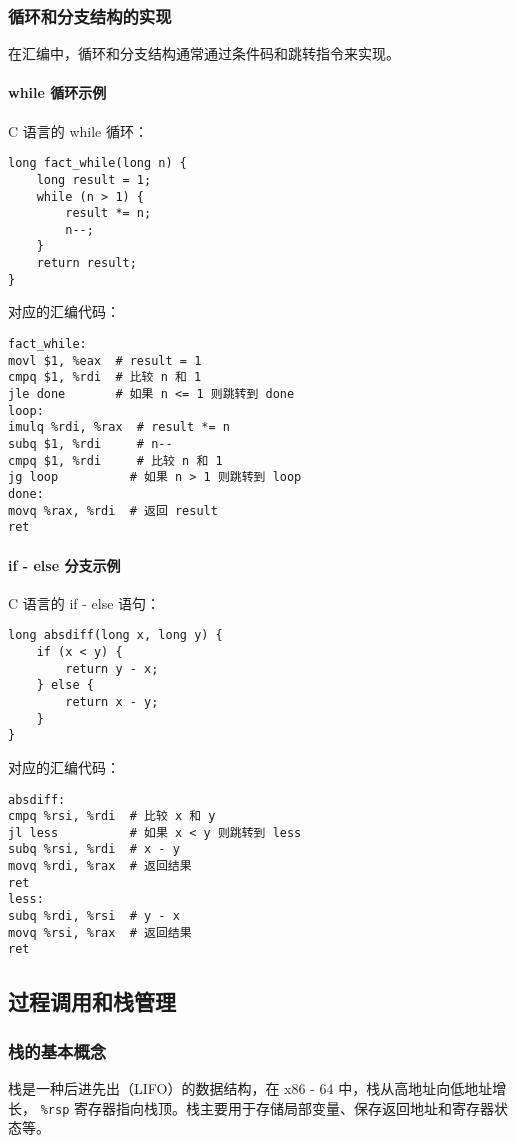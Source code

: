 \subsubsection{循环和分支结构的实现}
在汇编中，循环和分支结构通常通过条件码和跳转指令来实现。

\paragraph{while 循环示例}
C 语言的 while 循环：
\begin{verbatim}
long fact_while(long n) {
    long result = 1;
    while (n > 1) {
        result *= n;
        n--;
    }
    return result;
}
\end{verbatim}
对应的汇编代码：
\begin{verbatim}
fact_while:
movl $1, %eax  # result = 1
cmpq $1, %rdi  # 比较 n 和 1
jle done       # 如果 n <= 1 则跳转到 done
loop:
imulq %rdi, %rax  # result *= n
subq $1, %rdi     # n--
cmpq $1, %rdi     # 比较 n 和 1
jg loop          # 如果 n > 1 则跳转到 loop
done:
movq %rax, %rdi  # 返回 result
ret
\end{verbatim}

\paragraph{if - else 分支示例}
C 语言的 if - else 语句：
\begin{verbatim}
long absdiff(long x, long y) {
    if (x < y) {
        return y - x;
    } else {
        return x - y;
    }
}
\end{verbatim}
对应的汇编代码：
\begin{verbatim}
absdiff:
cmpq %rsi, %rdi  # 比较 x 和 y
jl less          # 如果 x < y 则跳转到 less
subq %rsi, %rdi  # x - y
movq %rdi, %rax  # 返回结果
ret
less:
subq %rdi, %rsi  # y - x
movq %rsi, %rax  # 返回结果
ret
\end{verbatim}

\subsection{过程调用和栈管理}
\subsubsection{栈的基本概念}
栈是一种后进先出（LIFO）的数据结构，在 x86 - 64 中，栈从高地址向低地址增长， \texttt{\%rsp} 寄存器指向栈顶。栈主要用于存储局部变量、保存返回地址和寄存器状态等。


